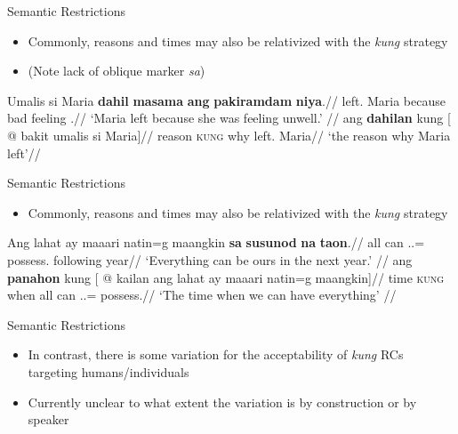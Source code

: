\documentclass[pdf]{beamer}
\newcommand{\g}[1]{\textsc{#1}}
\newcommand{\Ng}{\Gen}
\newcommand{\Natin}{\Fpl.\Incl.\Ng}
\newcommand{\Niya}{\Tsg.\Ng}  \newcommand{\Nila}{\Tpl.\Ng}
\newcommand{\texthl}[1]{\textcolor{cyan!75!blue}{\textbf{#1}}}
\begin{document}
\begin{frame}{Semantic Restrictions}
  \begin{itemize}
    \item Commonly, reasons and times may also be relativized with the \textit{kung} strategy
    \item (Note lack of oblique marker \textit{sa})
  \end{itemize}
  \ex\begingl
    \gla  Umalis si Maria \texthl{dahil} \texthl{masama} \texthl{ang} \texthl{pakiramdam} \texthl{niya}.//
    \glb  left.\Av{} \Nom{} Maria because bad \Nom{} feeling \Niya{}//
    \glft `Maria left because she was feeling unwell.'
          //
  \endgl
  \xe
  \ex\begingl
    \gla  ang \texthl{dahilan} kung [ @ bakit umalis si Maria]//
    \glb  \Nom{} reason \g{kung} why left.\Av{} \Nom{} Maria//
    \glft `the reason why Maria left'//
  \endgl
  \xe
\end{frame}

\begin{frame}{Semantic Restrictions}
  \begin{itemize}
    \item Commonly, reasons and times may also be relativized with the \textit{kung} strategy
  \end{itemize}
  \ex\begingl
    \gla  Ang lahat ay maaari natin=g maangkin \texthl{sa} \texthl{susunod} \texthl{na} \texthl{taon}.//
    \glb  \Nom{} all \Ay{} can \Natin=\Lk{} possess.\Pv{} \Obl{} following \Lk{} year//
    \glft `Everything can be ours in the next year.'
          //
  \endgl
  \xe
  \ex\begingl
    \gla  ang \texthl{panahon} kung [ @ kailan ang lahat ay maaari natin=g maangkin]//
    \glb  \Nom{} time \g{kung} when \Nom{} all \Ay{} can \Natin=\Lk{} possess.\Pv{}//
    \glft `The time when we can have everything'
          //
  \endgl
  \xe
\end{frame}

\begin{frame}{Semantic Restrictions}
  \begin{itemize}
    \item In contrast, there is some variation for the acceptability of \textit{kung} RCs targeting humans/individuals
    \item Currently unclear to what extent the variation is by construction or by speaker
  \end{itemize}
\end{frame}
\end{document}
